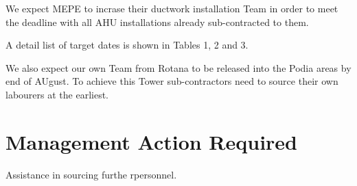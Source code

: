 We expect MEPE to incrase their ductwork installation Team in order to meet the \deadline deadline with all AHU installations already sub-contracted to them.

A detail list of target dates is shown in Tables 1, 2 and 3.

We also expect our own Team from Rotana to be released into the Podia areas by end of AUgust. To achieve this Tower sub-contractors need to source their own labourers at the earliest.


\section{Management Action Required}

Assistance in sourcing furthe rpersonnel.
